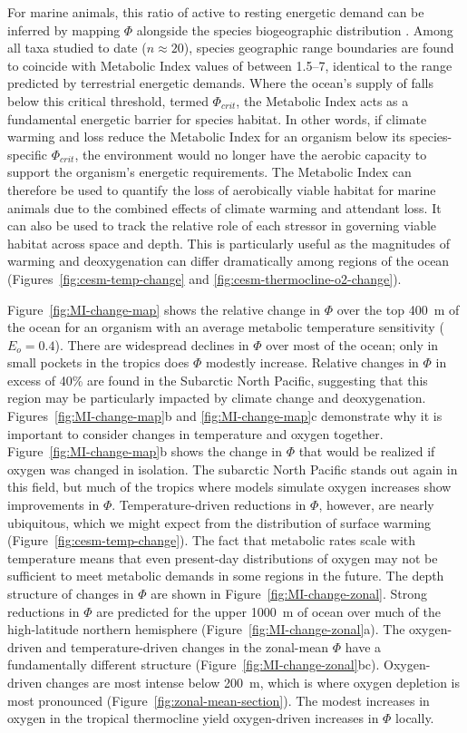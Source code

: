 \documentclass{report_chapter}
\begin{document}
For marine animals, this ratio of active to resting energetic demand can be inferred by mapping $\Phi$ alongside the species biogeographic distribution \citep{Deutsch-Ferrel-etal-2015}.
Among all taxa studied to date ($n\approx20$), species geographic range boundaries are found to coincide with Metabolic Index values of between 1.5--7, identical to the range predicted by terrestrial energetic demands.
Where the ocean's supply of \OO{} falls below this critical threshold, termed $\Phi_{crit}$, the Metabolic Index acts as a fundamental energetic barrier for species habitat.
In other words, if climate warming and \OO{} loss reduce the Metabolic Index for an organism below its species-specific $\Phi_{crit}$, the environment would no longer have the aerobic capacity to support the organism's energetic requirements.
The Metabolic Index can therefore be used to quantify the loss of aerobically viable habitat for marine animals due to the combined effects of climate warming and attendant \OO{} loss.
It can also be used to track the relative role of each stressor in governing viable habitat across space and depth.
This is particularly useful as the magnitudes of warming and deoxygenation can differ dramatically among regions of the ocean (Figures~\ref{fig:cesm-temp-change} and \ref{fig:cesm-thermocline-o2-change}).

Figure~\ref{fig:MI-change-map} shows the relative change in $\Phi$ over the top 400~m of the ocean for an organism with an average metabolic temperature sensitivity ($E_o = 0.4$).
There are widespread declines in $\Phi$ over most of the ocean; only in small pockets in the tropics does $\Phi$ modestly increase.
Relative changes in $\Phi$ in excess of 40\% are found in the Subarctic North Pacific, suggesting that this region may be particularly impacted by climate change and deoxygenation.
Figures~\ref{fig:MI-change-map}b and \ref{fig:MI-change-map}c demonstrate why it is important to consider changes in temperature and oxygen together.
Figure~\ref{fig:MI-change-map}b shows the change in $\Phi$ that would be realized if oxygen was changed in isolation.
The subarctic North Pacific stands out again in this field, but much of the tropics where models simulate oxygen increases show improvements in $\Phi$.
Temperature-driven reductions in $\Phi$, however, are nearly ubiquitous, which we might expect from the distribution of surface warming (Figure~\ref{fig:cesm-temp-change}).
The fact that metabolic rates scale with temperature means that even present-day distributions of oxygen may not be sufficient to meet metabolic demands in some regions in the future.
The depth structure of changes in $\Phi$ are shown in Figure~\ref{fig:MI-change-zonal}.
Strong reductions in $\Phi$ are predicted for the upper 1000~m of ocean over much of the high-latitude northern hemisphere (Figure~\ref{fig:MI-change-zonal}a).
The oxygen-driven and temperature-driven changes in the zonal-mean $\Phi$ have a fundamentally different structure (Figure~\ref{fig:MI-change-zonal}bc).
Oxygen-driven changes are most intense below 200~m, which is where oxygen depletion is most pronounced (Figure~\ref{fig:zonal-mean-section}).
The modest increases in oxygen in the tropical thermocline yield oxygen-driven increases in $\Phi$ locally.
\end{document}

